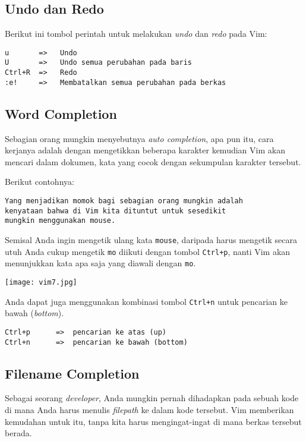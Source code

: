 \documentclass{article}
\begin{document}
\subsection{Undo dan Redo}
Berikut ini tombol perintah untuk melakukan \emph{undo} dan
\emph{redo} pada Vim:

\begin{verbatim}
u       =>   Undo
U       =>   Undo semua perubahan pada baris
Ctrl+R  =>   Redo
:e!     =>   Membatalkan semua perubahan pada berkas
\end{verbatim}

\subsection{Word Completion}
Sebagian orang mungkin menyebutnya \emph{auto completion},
apa pun itu, cara kerjanya adalah dengan mengetikkan
beberapa karakter kemudian Vim akan mencari dalam dokumen,
kata yang cocok dengan sekumpulan karakter tersebut.

Berikut contohnya:

\begin{verbatim}
Yang menjadikan momok bagi sebagian orang mungkin adalah
kenyataan bahwa di Vim kita dituntut untuk sesedikit 
mungkin menggunakan mouse.
\end{verbatim}

Semisal Anda ingin mengetik ulang kata \verb=mouse=,
daripada harus mengetik secara utuh Anda cukup mengetik
\verb=mo= diikuti dengan tombol \verb=Ctrl+p=, nanti Vim
akan menunjukkan kata apa saja yang diawali dengan
\verb=mo=.

\vspace{12pt}

\texttt{[image: vim7.jpg]}

Anda dapat juga menggunakan kombinasi tombol \verb=Ctrl+n=
untuk pencarian ke bawah (\emph{bottom}).

\begin{verbatim}
Ctrl+p      =>  pencarian ke atas (up)
Ctrl+n      =>  pencarian ke bawah (bottom)
\end{verbatim}

\subsection{Filename Completion}
Sebagai seorang \emph{developer}, Anda mungkin pernah
dihadapkan pada sebuah kode di mana Anda harus menulis
\emph{filepath} ke dalam kode tersebut. Vim memberikan
kemudahan untuk itu, tanpa kita harus mengingat-ingat di
mana berkas tersebut berada.
\end{document}
